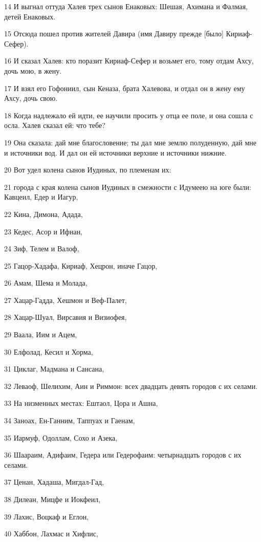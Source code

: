 \par 14 И выгнал оттуда Халев трех сынов Енаковых: Шешая, Ахимана и Фалмая, детей Енаковых.
\par 15 Отсюда пошел против жителей Давира (имя Давиру прежде [было] Кириаф-Сефер).
\par 16 И сказал Халев: кто поразит Кириаф-Сефер и возьмет его, тому отдам Ахсу, дочь мою, в жену.
\par 17 И взял его Гофониил, сын Кеназа, брата Халевова, и отдал он в жену ему Ахсу, дочь свою.
\par 18 Когда надлежало ей идти, ее научили просить у отца ее поле, и она сошла с осла. Халев сказал ей: что тебе?
\par 19 Она сказала: дай мне благословение; ты дал мне землю полуденную, дай мне и источники вод. И дал он ей источники верхние и источники нижние.
\par 20 Вот удел колена сынов Иудиных, по племенам их:
\par 21 города с края колена сынов Иудиных в смежности с Идумеею на юге были: Кавцеил, Едер и Иагур,
\par 22 Кина, Димона, Адада,
\par 23 Кедес, Асор и Ифнан,
\par 24 Зиф, Телем и Валоф,
\par 25 Гацор-Хадафа, Кириаф, Хецрон, иначе Гацор,
\par 26 Амам, Шема и Молада,
\par 27 Хацар-Гадда, Хешмон и Веф-Палет,
\par 28 Хацар-Шуал, Вирсавия и Визиофея,
\par 29 Ваала, Иим и Ацем,
\par 30 Елфолад, Кесил и Хорма,
\par 31 Циклаг, Мадмана и Сансана,
\par 32 Леваоф, Шелихим, Аин и Риммон: всех двадцать девять городов с их селами.
\par 33 На низменных местах: Ештаол, Цора и Ашна,
\par 34 Заноах, Ен-Ганним, Таппуах и Гаенам,
\par 35 Иармуф, Одоллам, Сохо и Азека,
\par 36 Шаараим, Адифаим, Гедера или Гедерофаим: четырнадцать городов с их селами.
\par 37 Ценан, Хадаша, Мигдал-Гад,
\par 38 Дилеан, Мицфе и Иокфеил,
\par 39 Лахис, Воцкаф и Еглон,
\par 40 Хаббон, Лахмас и Хифлис,
